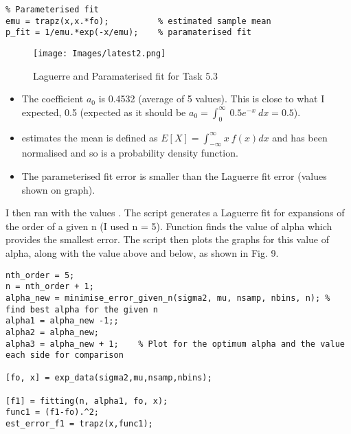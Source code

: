 \documentclass{article}
\begin{document}
\begin{lstlisting}
% Parameterised fit
emu = trapz(x,x.*fo);          % estimated sample mean
p_fit = 1/emu.*exp(-x/emu);    % paramaterised fit
\end{lstlisting}

\begin{figure}[h]
\centering
	\begin{minipage}[c][][b]{0.45\linewidth}
		\begin{center}
		\texttt{[image: Images/latest2.png]}  
		\end{center}
		\caption[b]{Laguerre and Paramaterised fit for Task 5.3}
		\label{fourierapproximationtriangle}
	\end{minipage}
\end{figure}

\begin{itemize}

\item The coefficient $a_0$ is 0.4532 (average of 5 values). This is close to what I expected, 0.5 (expected as it should be $a_0 = \int_0^\infty \ 0.5e^{-x}\ dx = 0.5$).

\item {} estimates the mean is defined as $E[X] = \int_{-\infty} ^\infty x \ f(x) dx$ and  has been normalised and so is a probability density function.

\item The parameterised fit error is smaller than the Laguerre fit error (values shown on graph).

\end{itemize}


I then ran  with the values . The script  generates a Laguerre fit for expansions of the order of a given n (I used n = 5). Function  finds the value of alpha which provides the smallest error. The script then plots the graphs for this value of alpha, along with the value above and below, as shown in Fig. 9.

\begin{lstlisting}
nth_order = 5;
n = nth_order + 1;
alpha_new = minimise_error_given_n(sigma2, mu, nsamp, nbins, n); % find best alpha for the given n
alpha1 = alpha_new -1;;
alpha2 = alpha_new;
alpha3 = alpha_new + 1;    % Plot for the optimum alpha and the value each side for comparison

[fo, x] = exp_data(sigma2,mu,nsamp,nbins);

[f1] = fitting(n, alpha1, fo, x);
func1 = (f1-fo).^2;
est_error_f1 = trapz(x,func1); 
\end{lstlisting}
\end{document}
